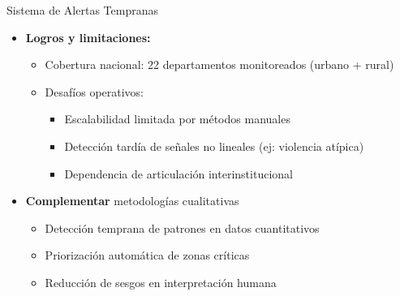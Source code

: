 \begin{frame}{Sistema de Alertas Tempranas}
    \begin{itemize}
        \item \textbf{Logros y limitaciones:}
        \begin{itemize}
            
            \item \alert{Cobertura nacional}: 22 departamentos monitoreados (urbano + rural)
            \item \alert{Desafíos operativos}:
            \begin{itemize}
                
                \item Escalabilidad limitada por métodos manuales
                \item Detección tardía de señales no lineales (ej: violencia atípica)
                \item Dependencia de articulación interinstitucional
            \end{itemize}
        \end{itemize}
        \pause
        
        \vspace{0.1cm}
        \item \textbf{\alert{Complementar}} metodologías cualitativas
        \begin{itemize}
            \item Detección temprana de patrones en datos cuantitativos
            \item Priorización automática de zonas críticas
            \item Reducción de sesgos en interpretación humana
        \end{itemize}
    \end{itemize}

\end{frame}